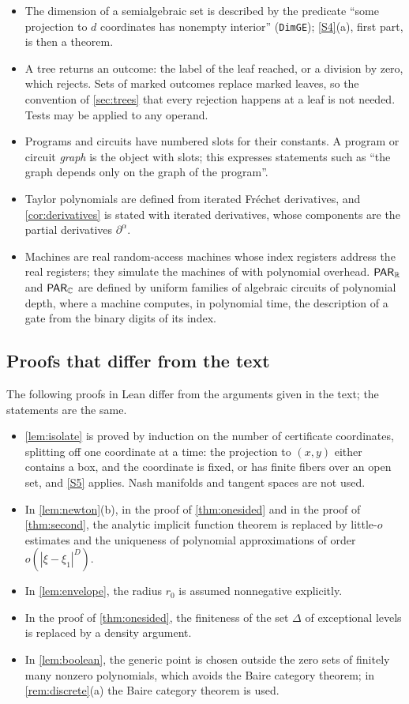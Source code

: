 \begin{itemize}[leftmargin=1.6em,itemsep=1pt]
\item The dimension of a semialgebraic set is described by the predicate ``some projection to $d$ coordinates has nonempty interior'' (\texttt{DimGE}); \ref{S4}(a), first part, is then a theorem.
\item A tree returns an outcome: the label of the leaf reached, or a division by zero, which rejects. Sets of marked outcomes replace marked leaves, so the convention of \cref{sec:trees} that every rejection happens at a leaf is not needed. Tests may be applied to any operand.
\item Programs and circuits have numbered slots for their constants. A program or circuit \emph{graph} is the object with slots; this expresses statements such as ``the graph depends only on the graph of the program''.
\item Taylor polynomials are defined from iterated Fr\'echet derivatives, and \cref{cor:derivatives} is stated with iterated derivatives, whose components are the partial derivatives $\partial^\alpha$.
\item Machines are real random-access machines whose index registers address the real registers; they simulate the machines of \cite{BCSS98} with polynomial overhead. $\textsf{\upshape PAR}_{\mathbb{R}}$ and $\textsf{\upshape PAR}_{\mathbb{C}}$ are defined by uniform families of algebraic circuits of polynomial depth, where a machine computes, in polynomial time, the description of a gate from the binary digits of its index.
\end{itemize}

\subsection{Proofs that differ from the text}

The following proofs in Lean differ from the arguments given in the text; the statements are the same.
\begin{itemize}[leftmargin=1.6em,itemsep=1pt]
\item \cref{lem:isolate} is proved by induction on the number of certificate coordinates, splitting off one coordinate at a time: the projection to $(x,y)$ either contains a box, and the coordinate is fixed, or has finite fibers over an open set, and \ref{S5} applies. Nash manifolds and tangent spaces are not used.
\item In \cref{lem:newton}(b), in the proof of \cref{thm:onesided} and in the proof of \cref{thm:second}, the analytic implicit function theorem is replaced by little-$o$ estimates and the uniqueness of polynomial approximations of order $o(|\xi-\xi_1|^D)$.
\item In \cref{lem:envelope}, the radius $r_0$ is assumed nonnegative explicitly.
\item In the proof of \cref{thm:onesided}, the finiteness of the set $\Delta$ of exceptional levels is replaced by a density argument.
\item In \cref{lem:boolean}, the generic point is chosen outside the zero sets of finitely many nonzero polynomials, which avoids the Baire category theorem; in \cref{rem:discrete}(a) the Baire category theorem is used.
\end{itemize}

